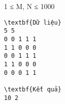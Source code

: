 1 ≤ M, N ≤ 1000
\begin{verbatim}
\textbf{Dữ liệu}
5 5
0 0 1 1 1 
1 1 0 0 0
0 0 1 1 1
1 1 0 0 0
0 0 0 1 1	

\textbf{Kết quả}
10 2
\end{verbatim}